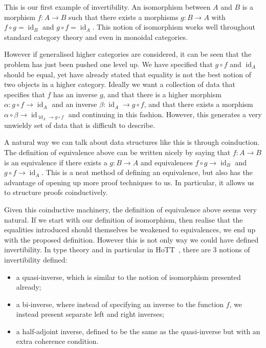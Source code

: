 \documentclass{article}
\theoremstyle{definition}
\theoremstyle{remark}
\DeclareMathOperator{\id}{id}
\begin{document}
This is our first example of invertibility. An isomorphism between \(A\) and \(B\) is a morphism \(f : A \to B\) such that there exists a morphisms \(g : B \to A\) with \(f \circ g = \id_B\) and \(g \circ f = \id_A\). This notion of isomorphism works well throughout standard category theory and even in monoidal categories.

However if generalised higher categories are considered, it can be seen that the problem has just been pushed one level up. We have specified that \(g \circ f\) and \(\id_A\) should be equal, yet have already stated that equality is not the best notion of two objects in a higher category. Ideally we want a collection of data that specifies that \(f\) has an inverse \(g\), and that there is a higher morphism \(\alpha : g \circ f \to \id_A\) and an inverse \(\beta : \id_A \to g \circ f\), and that there exists a morphism \(\alpha \circ \beta \to \id_{\id_A \to g \circ f}\) and continuing in this fashion. However, this generates a very unwieldy set of data that is difficult to describe.

A natural way we can talk about data structures like this is through coinduction. The definition of equivalence above can be written nicely by saying that \(f : A \to B\) is an equivalence if there exists a \(g : B \to A\) and equivalences \(f \circ g \to \id_B\) and \(g \circ f \to \id_A\). This is a neat method of defining an equivalence, but also has the advantage of opening up more proof techniques to us. In particular, it allows us to structure proofs coinductively.

Given this coinductive machinery, the definition of equivalence above seems very natural. If we start with our definition of isomorphism, then realise that the equalities introduced should themselves be weakened to equivalences, we end up with the proposed definition. However this is not only way we could have defined invertibility. In type theory and in particular in HoTT~\cite{hottbook}, there are 3 notions of invertibility defined:

\begin{itemize}
\item a quasi-inverse, which is similar to the notion of isomorphism presented already;
\item a bi-inverse, where instead of specifying an inverse to the function \(f\), we instead present separate left and right inverses;
\item a half-adjoint inverse, defined to be the same as the quasi-inverse but with an extra coherence condition.
\end{itemize}
\end{document}
